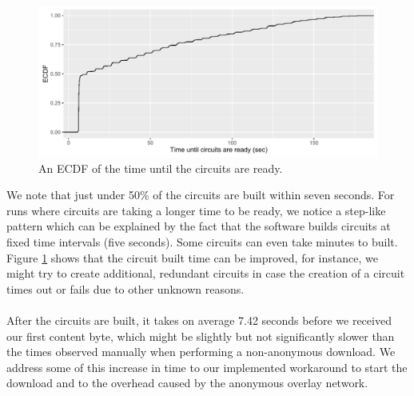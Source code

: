 \begin{figure}[!h]
	\centering
	\includegraphics[width=1.0\columnwidth]{images/big_experiment/circuits_ecdf}
	\caption{An ECDF of the time until the circuits are ready.}
	\label{fig:big-experiment-circuits}
\end{figure}

\noindent  We note that just under 50\% of the circuits are built within seven seconds. For runs where circuits are taking a longer time to be ready, we notice a step-like pattern which can be explained by the fact that the software builds circuits at fixed time intervals (five seconds). Some circuits can even take minutes to built. Figure \ref{fig:big-experiment-circuits} shows that the circuit built time can be improved, for instance, we might try to create additional, redundant circuits in case the creation of a circuit times out or fails due to other unknown reasons.\\\\
After the circuits are built, it takes on average 7.42 seconds before we received our first content byte, which might be slightly but not significantly slower than the times observed manually when performing a non-anonymous download. We address some of this increase in time to our implemented workaround to start the download and to the overhead caused by the anonymous overlay network.

